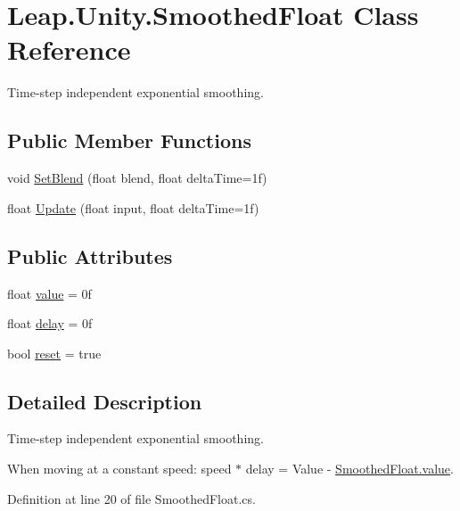 \hypertarget{class_leap_1_1_unity_1_1_smoothed_float}{}\section{Leap.\+Unity.\+Smoothed\+Float Class Reference}
\label{class_leap_1_1_unity_1_1_smoothed_float}


Time-\/step independent exponential smoothing.  


\subsection*{Public Member Functions}
\begin{DoxyCompactItemize}
\item 
void \mbox{\hyperlink{class_leap_1_1_unity_1_1_smoothed_float_a2c8704ac663800cb27c38cc6377bba06}{Set\+Blend}} (float blend, float delta\+Time=1f)
\item 
float \mbox{\hyperlink{class_leap_1_1_unity_1_1_smoothed_float_ad83fc14468793a846eb227919002fed0}{Update}} (float input, float delta\+Time=1f)
\end{DoxyCompactItemize}
\subsection*{Public Attributes}
\begin{DoxyCompactItemize}
\item 
float \mbox{\hyperlink{class_leap_1_1_unity_1_1_smoothed_float_a1fdf3ee4ae067a5ccb975320829a4327}{value}} = 0f
\item 
float \mbox{\hyperlink{class_leap_1_1_unity_1_1_smoothed_float_a5cd6d4133c91fa19fd4599f446f3d7f5}{delay}} = 0f
\item 
bool \mbox{\hyperlink{class_leap_1_1_unity_1_1_smoothed_float_a3d1208cb585d835e90d82118724082c7}{reset}} = true
\end{DoxyCompactItemize}


\subsection{Detailed Description}
Time-\/step independent exponential smoothing. 

When moving at a constant speed\+: speed $\ast$ delay = Value -\/ \mbox{\hyperlink{class_leap_1_1_unity_1_1_smoothed_float_a1fdf3ee4ae067a5ccb975320829a4327}{Smoothed\+Float.\+value}}. 

Definition at line 20 of file Smoothed\+Float.\+cs.



